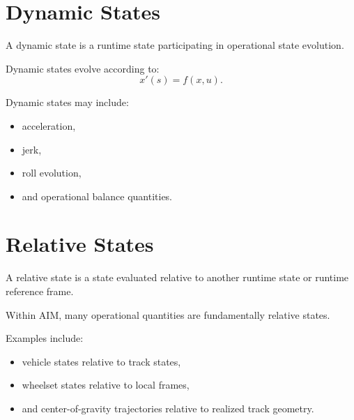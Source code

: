 \section{Dynamic States}

\begin{definition}
\label{def:taxonomy-dynamic-state}
A dynamic state is a runtime state participating in operational state
evolution.
\end{definition}

\begin{remark}
Dynamic states evolve according to:
\[
x'(s)
=
f(x,u).
\]
\end{remark}

\begin{remark}
Dynamic states may include:
\begin{itemize}
\item acceleration,
\item jerk,
\item roll evolution,
\item and operational balance quantities.
\end{itemize}
\end{remark}

\section{Relative States}

\begin{definition}
\label{def:taxonomy-relative-state}
A relative state is a state evaluated relative to another runtime state
or runtime reference frame.
\end{definition}

\begin{remark}
Within AIM, many operational quantities are fundamentally relative
states.
\end{remark}

\begin{remark}
Examples include:
\begin{itemize}
\item vehicle states relative to track states,
\item wheelset states relative to local frames,
\item and center-of-gravity trajectories relative to realized track
geometry.
\end{itemize}
\end{remark}

